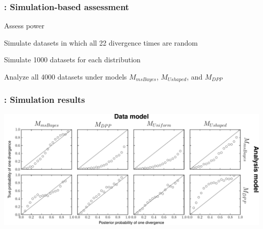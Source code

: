 \begin{frame}
    \frametitle{\dppmsbayes: Simulation-based assessment}
    Assess power \\
    \smallskip
    \begin{myitemize}
        \item Simulate datasets in which all 22 divergence times are random
        \item Simulate 1000 datasets for each \divTime{} distribution
        \item Analyze all 4000 datasets under models $M_{msBayes}$, $M_{Ushaped}$, and $M_{DPP}$
    \end{myitemize}
\end{frame}

\begin{frame}
    \frametitle{\dppmsbayes: Simulation results}
    \centerline{
        \includegraphics[width=1.13\textwidth]{../images/validation-model-choice-old-dpp-full.pdf}}
\end{frame}

